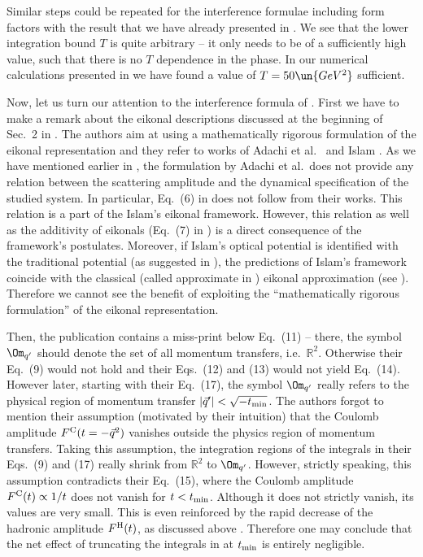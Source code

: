 Similar steps could be repeated for the interference formulae including form factors with the result that we have already presented in . We see that the lower integration bound $T$ is quite arbitrary -- it only needs to be of a sufficiently high value, such that there is no $T$ dependence in the phase. In our numerical calculations presented in  we have found a value of $T=50\un{GeV^2}$ sufficient.


Now, let us turn our attention to the interference formula of \KaL{}. First we have to make a remark about the eikonal descriptions discussed at the beginning of Sec.~2 in . The authors aim at using a mathematically rigorous formulation of the eikonal representation and they refer to works of Adachi et al.~ and Islam . As we have mentioned earlier in , the formulation by Adachi et al.~does not provide any relation between the scattering amplitude and the dynamical specification of the studied system. In particular, Eq.~(6) in  does not follow from their works. This relation is a part of the Islam's eikonal framework. However, this relation as well as the additivity of eikonals (Eq.~(7) in ) is a direct consequence of the framework's postulates. Moreover, if Islam's optical potential is identified with the traditional potential (as suggested in ), the predictions of Islam's framework coincide with the classical (called approximate in ) eikonal approximation (see ). Therefore we cannot see the benefit of exploiting the ``mathematically rigorous formulation'' of the eikonal representation.

Then, the publication  contains a miss-print below Eq.~(11) -- there, the symbol $\Om_{q'}$ should denote the set of all momentum transfers, i.e.~$\mathbb{R}^2$. Otherwise their Eq.~(9) would not hold and their Eqs.~(12) and (13) would not yield Eq.~(14). However later, starting with their Eq.~(17), the symbol $\Om_{q'}$ really refers to the physical region of momentum transfer $|\vec q'| < \sqrt{-t_{\rm min}}$. The authors forgot to mention their assumption (motivated by their intuition) that the Coulomb amplitude $F^{\rm C}(t = -\vec q^2)$ vanishes outside the physics region of momentum transfers. Taking this assumption, the integration regions of the integrals in their Eqs.~(9) and (17) really shrink from $\mathbb R^2$ to $\Om_{q'}$. However, strictly speaking, this assumption contradicts their Eq.~(15), where the Coulomb amplitude $F^{\rm C}(t) \propto 1/t$ does not vanish for $t < t_{\rm min}$. Although it does not strictly vanish, its values are very small. This is even reinforced by the rapid decrease of the hadronic amplitude $F^{\rm H}(t)$, as discussed above . Therefore one may conclude that the net effect of truncating the integrals in  at $t_{\rm min}$ is entirely negligible.

